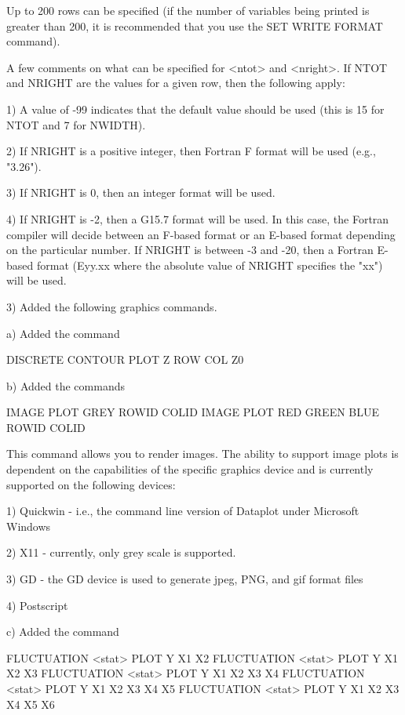 {       Up to 200 rows can be specified (if the number of variables
       being printed is greater than 200, it is recommended that
       you use the SET WRITE FORMAT command).

       A few comments on what can be specified for <ntot> and
       <nright>.  If NTOT and NRIGHT are the values for a given
       row, then the following apply:

       1) A value of -99 indicates that the default value
          should be used (this is 15 for NTOT and 7 for NWIDTH).

       2) If NRIGHT is a positive integer, then Fortran F format
          will be used (e.g.,  "3.26").

       3) If NRIGHT is 0, then an integer format will be used.

       4) If NRIGHT is -2, then a G15.7 format will be used.
          In this case, the Fortran compiler will decide between
          an F-based format or an E-based format depending on
          the particular number.  If NRIGHT is between -3 and
          -20, then a Fortran E-based format (Eyy.xx where the
          absolute value of NRIGHT specifies the "xx") will be
          used.

 3) Added the following graphics commands.

    a) Added the command

          DISCRETE CONTOUR PLOT Z ROW COL Z0

    b) Added the commands

          IMAGE PLOT GREY ROWID COLID
          IMAGE PLOT RED GREEN BLUE ROWID COLID

       This command allows you to render images.  The ability to
       support image plots is dependent on the capabilities of
       the specific graphics device and is currently supported
       on the following devices:

          1) Quickwin     - i.e., the command line version of
                            Dataplot under Microsoft Windows

          2) X11          - currently, only grey scale is supported.

          3) GD           - the GD device is used to generate jpeg,
                            PNG, and gif format files

          4) Postscript

    c) Added the command

          FLUCTUATION <stat> PLOT Y X1 X2
          FLUCTUATION <stat> PLOT Y X1 X2 X3
          FLUCTUATION <stat> PLOT Y X1 X2 X3 X4
          FLUCTUATION <stat> PLOT Y X1 X2 X3 X4 X5
          FLUCTUATION <stat> PLOT Y X1 X2 X3 X4 X5 X6

}
